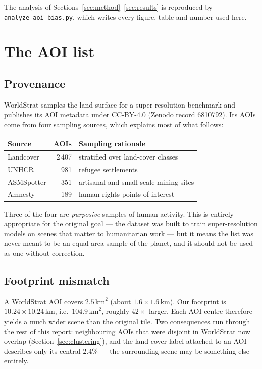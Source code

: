 \documentclass[11pt,a4paper]{article}
\begin{document}
The analysis of Sections~\ref{sec:method}--\ref{sec:results} is reproduced by
\texttt{analyze\_aoi\_bias.py}, which writes every figure, table and number used here.

\section{The AOI list}

\subsection{Provenance}

WorldStrat \cite{worldstrat} samples the land surface for a super-resolution benchmark and
publishes its AOI metadata under CC-BY-4.0 (Zenodo record 6810792). Its AOIs come from four
sampling sources, which explains most of what follows:

\begin{center}
\begin{tabular}{lrl}
\toprule
Source & AOIs & Sampling rationale \\
\midrule
Landcover  & 2\,407 & stratified over land-cover classes \\
UNHCR      & 981    & refugee settlements \\
ASMSpotter & 351    & artisanal and small-scale mining sites \\
Amnesty    & 189    & human-rights points of interest \\
\bottomrule
\end{tabular}
\end{center}

Three of the four are \emph{purposive} samples of human activity. This is entirely appropriate
for the original goal --- the dataset was built to train super-resolution models on scenes that
matter to humanitarian work --- but it means the list was never meant to be an equal-area sample
of the planet, and it should not be used as one without correction.

\subsection{Footprint mismatch}
\label{sec:footprint}

A WorldStrat AOI covers $2.5\,\mathrm{km}^2$ (about $1.6\times1.6$\,km). Our footprint is
$10.24\times10.24$\,km, i.e.\ $104.9\,\mathrm{km}^2$, roughly $42\times$ larger. Each AOI centre
therefore yields a much wider scene than the original tile. Two consequences run through the
rest of this report: neighbouring AOIs that were disjoint in WorldStrat now overlap
(Section~\ref{sec:clustering}), and the land-cover label attached to an AOI describes only its
central $2.4\%$ --- the surrounding scene may be something else entirely.
\end{document}
